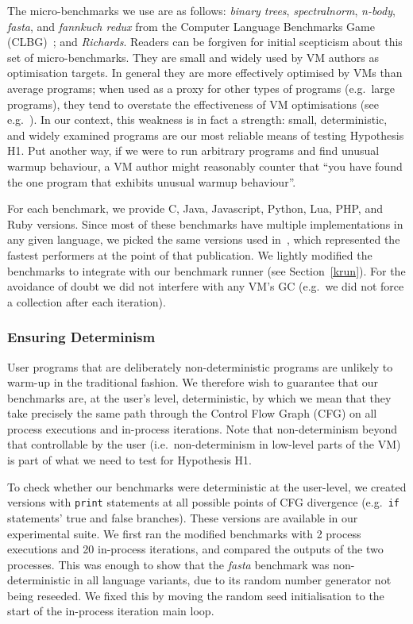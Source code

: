 \documentclass[preprint,numbers,10pt]{sigplanconf}
\newcommand{\binarytrees}{\emph{binary trees}\xspace}
\newcommand{\richards}{\emph{Richards}\xspace}
\newcommand{\spectralnorm}{\emph{spectralnorm}\xspace}
\newcommand{\nbody}{\emph{n-body}\xspace}
\newcommand{\fasta}{\emph{fasta}\xspace}
\newcommand{\fannkuch}{\emph{fannkuch redux}\xspace}
\begin{document}
The micro-benchmarks we use are as follows: \binarytrees, \spectralnorm, \nbody,
\fasta, and \fannkuch from the Computer Language Benchmarks Game (CLBG)~\cite{clbg}; and
\richards. Readers can be forgiven for initial scepticism about this set of micro-benchmarks.
They are small and widely
used by VM authors as optimisation targets. In general they are more effectively
optimised by VMs than average programs; when used as a proxy for other types
of programs (e.g.~large programs), they tend to overstate the effectiveness of
VM optimisations (see e.g.~\cite{ratanaworabhan09jsmeter}). In our context, this weakness is in fact a strength:
small, deterministic, and widely examined programs are our most
reliable means of testing Hypothesis H1. Put another way, if we were to run arbitrary programs
and find unusual warmup behaviour, a VM author might reasonably counter that
``you have found the one program that exhibits unusual warmup behaviour''.

For each benchmark, we provide C, Java, Javascript, Python, Lua, PHP,
and Ruby versions. Since most of these
benchmarks have multiple implementations in any given language, we picked
the same versions used in~\cite{bolz14impact}, which represented the fastest
performers at the point of that publication. We lightly modified
the benchmarks to integrate with our benchmark runner (see Section~\ref{krun}).
For the avoidance of doubt we did not interfere with any VM's GC (e.g.~we did not
force a collection after each iteration).


\subsubsection{Ensuring Determinism}

User programs that are deliberately non-deterministic programs are unlikely to
warm-up in the traditional fashion.
We therefore wish to guarantee that our benchmarks are,
at the user's level, deterministic, by which we mean that they
take precisely the same path through the Control Flow Graph (CFG)
on all process executions and in-process iterations. Note that non-determinism
beyond that controllable by the user (i.e.~non-determinism in low-level parts of
the VM) is part of what we need to test for Hypothesis H1.

To check whether our benchmarks were deterministic at the user-level, we created
versions with \texttt{print} statements at all possible points of CFG
divergence (e.g.~\texttt{if} statements' true and false branches).
These versions are available in our experimental suite. We first ran the modified
benchmarks with 2 process executions and 20 in-process iterations,
and compared the outputs of the two processes. This was enough to show that the
\fasta benchmark was non-deterministic
in all language variants, due to its random number generator not being reseeded. We
fixed this by moving the random seed initialisation to the start
of the in-process iteration main loop.
\end{document}
